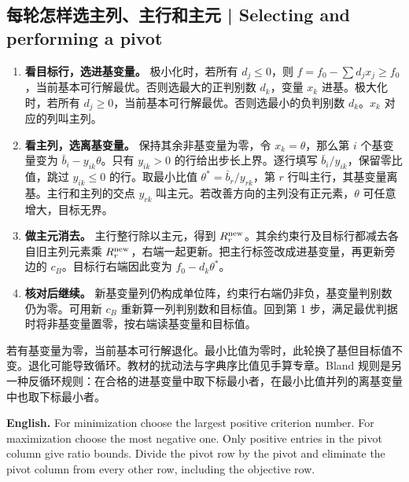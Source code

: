 \documentclass[UTF8,11pt,a4paper]{ctexart}
\newcommand{\EN}[1]{\par\noindent \textbf{English.} #1\par}
\begin{document}
\subsection{每轮怎样选主列、主行和主元 | Selecting and performing a pivot}
\begin{enumerate}[label=\arabic*.]
\item \textbf{看目标行，选进基变量。} 极小化时，若所有 $d_j\le0$，则 $f=f_0-\sum d_jx_j\ge f_0$，当前基本可行解最优。否则选最大的正判别数 $d_k$，变量 $x_k$ 进基。极大化时，若所有 $d_j\ge0$，当前基本可行解最优。否则选最小的负判别数 $d_k$。$x_k$ 对应的列叫主列。
\item \textbf{看主列，选离基变量。} 保持其余非基变量为零，令 $x_k=\theta$，那么第 $i$ 个基变量变为 $\bar b_i-y_{ik}\theta$。只有 $y_{ik}>0$ 的行给出步长上界。逐行填写 $\bar b_i/y_{ik}$，保留零比值，跳过 $y_{ik}\le0$ 的行。取最小比值 $\theta^*=\bar b_r/y_{rk}$，第 $r$ 行叫主行，其基变量离基。主行和主列的交点 $y_{rk}$ 叫主元。若改善方向的主列没有正元素，$\theta$ 可任意增大，目标无界。
\item \textbf{做主元消去。} 主行整行除以主元，得到 $R_r^{\rm new}$。其余约束行及目标行都减去各自旧主列元素乘 $R_r^{\rm new}$，右端一起更新。把主行标签改成进基变量，再更新旁边的 $c_B$。目标行右端因此变为 $f_0-d_k\theta^*$。
\item \textbf{核对后继续。} 新基变量列仍构成单位阵，约束行右端仍非负，基变量判别数仍为零。可用新 $c_B$ 重新算一列判别数和目标值。回到第 1 步，满足最优判据时将非基变量置零，按右端读基变量和目标值。
\end{enumerate}
若有基变量为零，当前基本可行解退化。最小比值为零时，此轮换了基但目标值不变。退化可能导致循环。教材的扰动法与字典序比值见手算专章。Bland 规则是另一种反循环规则：在合格的进基变量中取下标最小者，在最小比值并列的离基变量中也取下标最小者。
\EN{For minimization choose the largest positive criterion number. For maximization choose the most negative one. Only positive entries in the pivot column give ratio bounds. Divide the pivot row by the pivot and eliminate the pivot column from every other row, including the objective row.}
\end{document}
